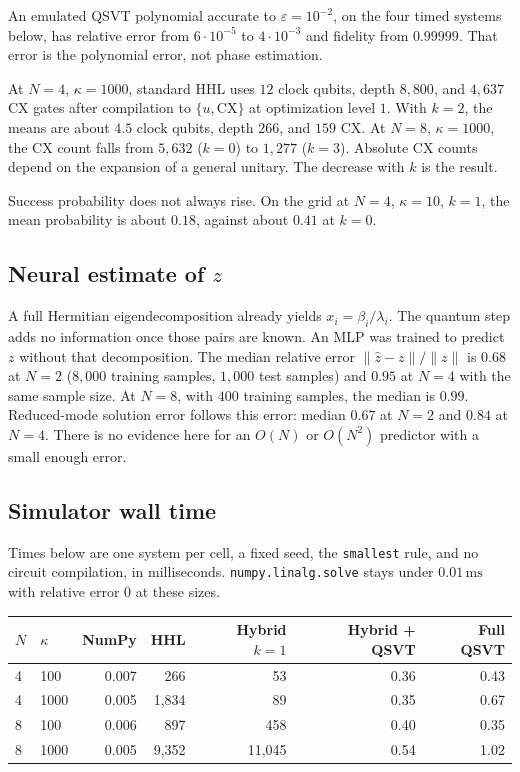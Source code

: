 \documentclass[11pt,a4paper]{article}
\begin{document}
An emulated QSVT polynomial accurate to \(\varepsilon=10^{-2}\), on the four timed systems below, has relative error from \(6\cdot 10^{-5}\) to \(4\cdot 10^{-3}\) and fidelity from \(0.99999\).
That error is the polynomial error, not phase estimation.

At \(N=4\), \(\kappa=1000\), standard HHL uses \(12\) clock qubits, depth \(8{,}800\), and \(4{,}637\) CX gates after compilation to \(\{u,\mathrm{CX}\}\) at optimization level \(1\).
With \(k=2\), the means are about \(4.5\) clock qubits, depth \(266\), and \(159\) CX.
At \(N=8\), \(\kappa=1000\), the CX count falls from \(5{,}632\) (\(k=0\)) to \(1{,}277\) (\(k=3\)).
Absolute CX counts depend on the expansion of a general unitary.
The decrease with \(k\) is the result.

Success probability does not always rise.
On the grid at \(N=4\), \(\kappa=10\), \(k=1\), the mean probability is about \(0.18\), against about \(0.41\) at \(k=0\).

\subsection{Neural estimate of \(z\)}
A full Hermitian eigendecomposition already yields \(x_i=\beta_i/\lambda_i\).
The quantum step adds no information once those pairs are known.
An MLP was trained to predict \(z\) without that decomposition.
The median relative error \(\lVert\hat z-z\rVert/\lVert z\rVert\) is \(0.68\) at \(N=2\) (\(8{,}000\) training samples, \(1{,}000\) test samples) and \(0.95\) at \(N=4\) with the same sample size.
At \(N=8\), with \(400\) training samples, the median is \(0.99\).
Reduced-mode solution error follows this error: median \(0.67\) at \(N=2\) and \(0.84\) at \(N=4\).
There is no evidence here for an \(O(N)\) or \(O(N^2)\) predictor with a small enough error.

\subsection{Simulator wall time}
Times below are one system per cell, a fixed seed, the \texttt{smallest} rule, and no circuit compilation, in milliseconds.
\texttt{numpy.linalg.solve} stays under \(0.01\,\mathrm{ms}\) with relative error \(0\) at these sizes.

\begin{center}
\begin{tabular}{@{}llrrrrr@{}}
\toprule
\(N\) & \(\kappa\) & NumPy & HHL & Hybrid \(k=1\) & Hybrid + QSVT & Full QSVT \\
\midrule
4 & 100 & 0.007 & 266 & 53 & 0.36 & 0.43 \\
4 & 1000 & 0.005 & 1{,}834 & 89 & 0.35 & 0.67 \\
8 & 100 & 0.006 & 897 & 458 & 0.40 & 0.35 \\
8 & 1000 & 0.005 & 9{,}352 & 11{,}045 & 0.54 & 1.02 \\
\bottomrule
\end{tabular}
\end{center}
\end{document}
